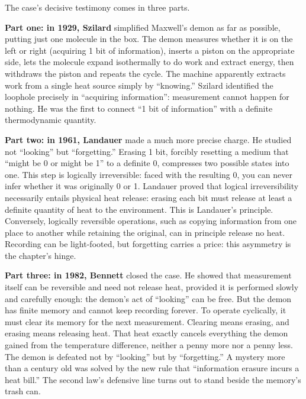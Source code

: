 The case's decisive testimony comes in three parts.

\textbf{Part one: in 1929, Szilard} simplified Maxwell's demon as far as possible, putting just one molecule in the box. The demon measures whether it is on the left or right (acquiring 1 bit of information), inserts a piston on the appropriate side, lets the molecule expand isothermally to do work and extract energy, then withdraws the piston and repeats the cycle. The machine apparently extracts work from a single heat source simply by ``knowing.'' Szilard identified the loophole precisely in ``acquiring information'': measurement cannot happen for nothing. He was the first to connect ``1 bit of information'' with a definite thermodynamic quantity.

\textbf{Part two: in 1961, Landauer} made a much more precise charge. He studied not ``looking'' but ``forgetting.'' Erasing 1 bit, forcibly resetting a medium that ``might be 0 or might be 1'' to a definite 0, compresses two possible states into one. This step is logically irreversible: faced with the resulting 0, you can never infer whether it was originally 0 or 1. Landauer proved that logical irreversibility necessarily entails physical heat release: erasing each bit must release at least a definite quantity of heat to the environment. This is Landauer's principle. Conversely, logically reversible operations, such as copying information from one place to another while retaining the original, can in principle release no heat. Recording can be light-footed, but forgetting carries a price: this asymmetry is the chapter's hinge.

\textbf{Part three: in 1982, Bennett} closed the case. He showed that measurement itself can be reversible and need not release heat, provided it is performed slowly and carefully enough: the demon's act of ``looking'' can be free. But the demon has finite memory and cannot keep recording forever. To operate cyclically, it must clear its memory for the next measurement. Clearing means erasing, and erasing means releasing heat. That heat exactly cancels everything the demon gained from the temperature difference, neither a penny more nor a penny less. The demon is defeated not by ``looking'' but by ``forgetting.'' A mystery more than a century old was solved by the new rule that ``information erasure incurs a heat bill.'' The second law's defensive line turns out to stand beside the memory's trash can.


